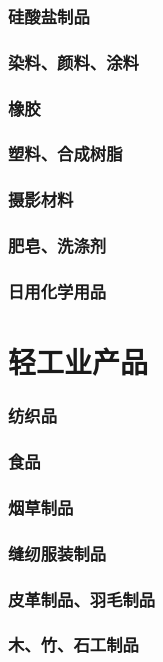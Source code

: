 \documentclass[UTF8]{../../RepresentationUniverse}
\begin{document}
    \subsubsection{硅酸盐制品}
    \subsubsection{染料、颜料、涂料}
    \subsubsection{橡胶}
    \subsubsection{塑料、合成树脂}
    \subsubsection{摄影材料}
    \subsubsection{肥皂、洗涤剂}
    \subsubsection{日用化学用品}
\section{轻工业产品}
    \subsubsection{纺织品}
    \subsubsection{食品}
    \subsubsection{烟草制品}
    \subsubsection{缝纫服装制品}
    \subsubsection{皮革制品、羽毛制品}
    \subsubsection{木、竹、石工制品}
\end{document}
